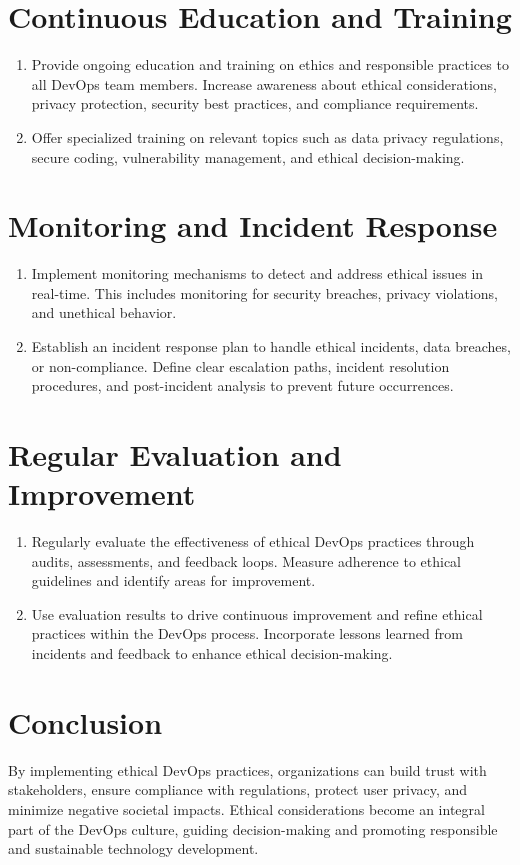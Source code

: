 \section*{Continuous Education and Training}
\begin{enumerate}
    \item Provide ongoing education and training on ethics and responsible practices to all DevOps team members. Increase awareness about ethical considerations, privacy protection, security best practices, and compliance requirements.

    \item Offer specialized training on relevant topics such as data privacy regulations, secure coding, vulnerability management, and ethical decision-making.
\end{enumerate}

\section*{Monitoring and Incident Response}
\begin{enumerate}
    \item Implement monitoring mechanisms to detect and address ethical issues in real-time. This includes monitoring for security breaches, privacy violations, and unethical behavior.

    \item Establish an incident response plan to handle ethical incidents, data breaches, or non-compliance. Define clear escalation paths, incident resolution procedures, and post-incident analysis to prevent future occurrences.
\end{enumerate}

\section*{Regular Evaluation and Improvement}
\begin{enumerate}
    \item Regularly evaluate the effectiveness of ethical DevOps practices through audits, assessments, and feedback loops. Measure adherence to ethical guidelines and identify areas for improvement.

    \item Use evaluation results to drive continuous improvement and refine ethical practices within the DevOps process. Incorporate lessons learned from incidents and feedback to enhance ethical decision-making.
\end{enumerate}

\section*{Conclusion}

By implementing ethical DevOps practices, organizations can build trust with stakeholders, ensure compliance with regulations, protect user privacy, and minimize negative societal impacts. Ethical considerations become an integral part of the DevOps culture, guiding decision-making and promoting responsible and sustainable technology development.